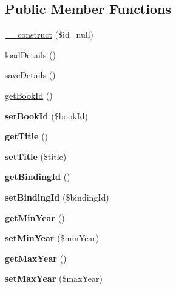 \subsection*{Public Member Functions}
\begin{DoxyCompactItemize}
\item 
\hyperlink{classBook_a6187e2b162dde2c970e8b33e0b8c57b8}{\_\-\_\-construct} (\$id=null)
\item 
\hyperlink{classBook_aa3c048838c2e1f68941d8074d517eb2e}{loadDetails} ()
\item 
\hyperlink{classBook_a746ae3bbd059bbc55d3ab6e578105ad8}{saveDetails} ()
\item 
\hyperlink{classBook_ac81f1151560d721510ddebc4b029cfcd}{getBookId} ()
\item 
\hypertarget{classBook_a8ca43b92b94d72aec30c5ae5eb2e86d4}{
{\bfseries setBookId} (\$bookId)}
\label{classBook_a8ca43b92b94d72aec30c5ae5eb2e86d4}

\item 
\hypertarget{classBook_a53e88c3c2f305b2b8ae03023e4c7a9b7}{
{\bfseries getTitle} ()}
\label{classBook_a53e88c3c2f305b2b8ae03023e4c7a9b7}

\item 
\hypertarget{classBook_aeb6dcd560f9553088c8455a553745985}{
{\bfseries setTitle} (\$title)}
\label{classBook_aeb6dcd560f9553088c8455a553745985}

\item 
\hypertarget{classBook_a56bc9125ccf7c8b6a61825b7a1839796}{
{\bfseries getBindingId} ()}
\label{classBook_a56bc9125ccf7c8b6a61825b7a1839796}

\item 
\hypertarget{classBook_a94281b197817d3f58098ecfb5676fd30}{
{\bfseries setBindingId} (\$bindingId)}
\label{classBook_a94281b197817d3f58098ecfb5676fd30}

\item 
\hypertarget{classBook_ac3dfb3d25211a4261acfc888b7f9a8d6}{
{\bfseries getMinYear} ()}
\label{classBook_ac3dfb3d25211a4261acfc888b7f9a8d6}

\item 
\hypertarget{classBook_a785b9db4734834aa02f920cd4870cdd4}{
{\bfseries setMinYear} (\$minYear)}
\label{classBook_a785b9db4734834aa02f920cd4870cdd4}

\item 
\hypertarget{classBook_a930368513090f0859e91460101835882}{
{\bfseries getMaxYear} ()}
\label{classBook_a930368513090f0859e91460101835882}

\item 
\hypertarget{classBook_a7d31599f960ec0d1fe0a48de6879b3f7}{
{\bfseries setMaxYear} (\$maxYear)}
\label{classBook_a7d31599f960ec0d1fe0a48de6879b3f7}


\end{DoxyCompactItemize}
